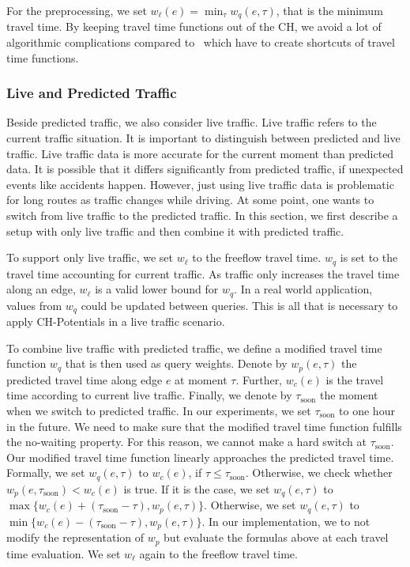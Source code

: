 \documentclass[manuscript,review]{acmart}
\begin{document}
For the preprocessing, we set $w_\ell(e) = \min_\tau w_q(e,\tau)$, that is the minimum travel time.
By keeping travel time functions out of the CH, we avoid a lot of algorithmic complications compared to~\cite{bgsv-mtdtt-13,bdpw-dtdrp-16,swz-sfert-20,dn-crdtd-12} which have to create shortcuts of travel time functions.

\subsubsection{Live and Predicted Traffic}
\label{sec:live-predicted-traffic}

Beside predicted traffic, we also consider live traffic.
Live traffic refers to the current traffic situation.
It is important to distinguish between predicted and live traffic.
Live traffic data is more accurate for the current moment than predicted data.
It is possible that it differs significantly from predicted traffic, if unexpected events like accidents happen.
However, just using live traffic data is problematic for long routes as traffic changes while driving.
At some point, one wants to switch from live traffic to the predicted traffic.
In this section, we first describe a setup with only live traffic and then combine it with predicted traffic.

To support only live traffic, we set $w_\ell$ to the freeflow travel time.
$w_q$ is set to the travel time accounting for current traffic.
As traffic only increases the travel time along an edge, $w_\ell$ is a valid lower bound for $w_q$.
In a real world application, values from $w_q$ could be updated between queries.
This is all that is necessary to apply CH-Potentials in a live traffic scenario.

To combine live traffic with predicted traffic, we define a modified travel time function $w_q$ that is then used as query weights.
Denote by $w_p(e,\tau)$ the predicted travel time along edge $e$ at moment $\tau$.
Further, $w_c(e)$ is the travel time according to current live traffic.
Finally, we denote by $\tau_{\mathrm{soon}}$ the moment when we switch to predicted traffic.
In our experiments, we set $\tau_{\mathrm{soon}}$ to one hour in the future.
We need to make sure that the modified travel time function fulfills the no-waiting property.
For this reason, we cannot make a hard switch at $\tau_{\mathrm{soon}}$.
Our modified travel time function linearly approaches the predicted travel time. %
%
Formally, we set $w_q(e,\tau)$ to $w_c(e)$, if $\tau \leq \tau_{\mathrm{soon}}$.
Otherwise, we check whether $w_p(e,\tau_{\mathrm{soon}}) < w_c(e)$ is true.
If it is the case, we set $w_q(e,\tau)$ to $\max\{w_c(e)+(\tau_{\mathrm{soon}}-\tau), w_p(e,\tau)\}$.
Otherwise, we set $w_q(e,\tau)$ to $\min\{w_c(e)-(\tau_{\mathrm{soon}}-\tau), w_p(e,\tau)\}$.
In our implementation, we to not modify the representation of $w_p$ but evaluate the formulas above at each travel time evaluation.
We set $w_\ell$ again to the freeflow travel time.
\end{document}
